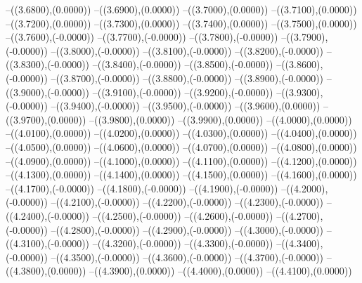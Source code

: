 {	--({\sx*(3.6800)},{\sy*(0.0000)})
	--({\sx*(3.6900)},{\sy*(0.0000)})
	--({\sx*(3.7000)},{\sy*(0.0000)})
	--({\sx*(3.7100)},{\sy*(0.0000)})
	--({\sx*(3.7200)},{\sy*(0.0000)})
	--({\sx*(3.7300)},{\sy*(0.0000)})
	--({\sx*(3.7400)},{\sy*(0.0000)})
	--({\sx*(3.7500)},{\sy*(0.0000)})
	--({\sx*(3.7600)},{\sy*(-0.0000)})
	--({\sx*(3.7700)},{\sy*(-0.0000)})
	--({\sx*(3.7800)},{\sy*(-0.0000)})
	--({\sx*(3.7900)},{\sy*(-0.0000)})
	--({\sx*(3.8000)},{\sy*(-0.0000)})
	--({\sx*(3.8100)},{\sy*(-0.0000)})
	--({\sx*(3.8200)},{\sy*(-0.0000)})
	--({\sx*(3.8300)},{\sy*(-0.0000)})
	--({\sx*(3.8400)},{\sy*(-0.0000)})
	--({\sx*(3.8500)},{\sy*(-0.0000)})
	--({\sx*(3.8600)},{\sy*(-0.0000)})
	--({\sx*(3.8700)},{\sy*(-0.0000)})
	--({\sx*(3.8800)},{\sy*(-0.0000)})
	--({\sx*(3.8900)},{\sy*(-0.0000)})
	--({\sx*(3.9000)},{\sy*(-0.0000)})
	--({\sx*(3.9100)},{\sy*(-0.0000)})
	--({\sx*(3.9200)},{\sy*(-0.0000)})
	--({\sx*(3.9300)},{\sy*(-0.0000)})
	--({\sx*(3.9400)},{\sy*(-0.0000)})
	--({\sx*(3.9500)},{\sy*(-0.0000)})
	--({\sx*(3.9600)},{\sy*(0.0000)})
	--({\sx*(3.9700)},{\sy*(0.0000)})
	--({\sx*(3.9800)},{\sy*(0.0000)})
	--({\sx*(3.9900)},{\sy*(0.0000)})
	--({\sx*(4.0000)},{\sy*(0.0000)})
	--({\sx*(4.0100)},{\sy*(0.0000)})
	--({\sx*(4.0200)},{\sy*(0.0000)})
	--({\sx*(4.0300)},{\sy*(0.0000)})
	--({\sx*(4.0400)},{\sy*(0.0000)})
	--({\sx*(4.0500)},{\sy*(0.0000)})
	--({\sx*(4.0600)},{\sy*(0.0000)})
	--({\sx*(4.0700)},{\sy*(0.0000)})
	--({\sx*(4.0800)},{\sy*(0.0000)})
	--({\sx*(4.0900)},{\sy*(0.0000)})
	--({\sx*(4.1000)},{\sy*(0.0000)})
	--({\sx*(4.1100)},{\sy*(0.0000)})
	--({\sx*(4.1200)},{\sy*(0.0000)})
	--({\sx*(4.1300)},{\sy*(0.0000)})
	--({\sx*(4.1400)},{\sy*(0.0000)})
	--({\sx*(4.1500)},{\sy*(0.0000)})
	--({\sx*(4.1600)},{\sy*(0.0000)})
	--({\sx*(4.1700)},{\sy*(-0.0000)})
	--({\sx*(4.1800)},{\sy*(-0.0000)})
	--({\sx*(4.1900)},{\sy*(-0.0000)})
	--({\sx*(4.2000)},{\sy*(-0.0000)})
	--({\sx*(4.2100)},{\sy*(-0.0000)})
	--({\sx*(4.2200)},{\sy*(-0.0000)})
	--({\sx*(4.2300)},{\sy*(-0.0000)})
	--({\sx*(4.2400)},{\sy*(-0.0000)})
	--({\sx*(4.2500)},{\sy*(-0.0000)})
	--({\sx*(4.2600)},{\sy*(-0.0000)})
	--({\sx*(4.2700)},{\sy*(-0.0000)})
	--({\sx*(4.2800)},{\sy*(-0.0000)})
	--({\sx*(4.2900)},{\sy*(-0.0000)})
	--({\sx*(4.3000)},{\sy*(-0.0000)})
	--({\sx*(4.3100)},{\sy*(-0.0000)})
	--({\sx*(4.3200)},{\sy*(-0.0000)})
	--({\sx*(4.3300)},{\sy*(-0.0000)})
	--({\sx*(4.3400)},{\sy*(-0.0000)})
	--({\sx*(4.3500)},{\sy*(-0.0000)})
	--({\sx*(4.3600)},{\sy*(-0.0000)})
	--({\sx*(4.3700)},{\sy*(-0.0000)})
	--({\sx*(4.3800)},{\sy*(0.0000)})
	--({\sx*(4.3900)},{\sy*(0.0000)})
	--({\sx*(4.4000)},{\sy*(0.0000)})
	--({\sx*(4.4100)},{\sy*(0.0000)})
}
